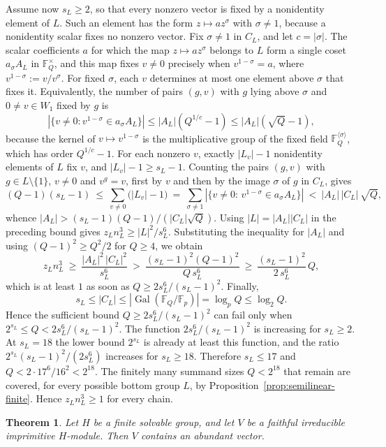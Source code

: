 \documentclass[10pt]{amsart}
\newtheorem{theorem}{Theorem}[section]
\theoremstyle{definition}
\renewcommand{\le}{\leqslant}
\renewcommand{\ge}{\geqslant}
\renewcommand{\geq}{\geqslant}
\let\oldendproof\endproof
\renewenvironment{proof}[1][\proofname]{%
  \oldproof[\bfseries #1]%
}{\oldendproof}
\DeclareMathOperator{\Gal}{Gal}
\numberwithin{equation}{section}
\numberwithin{table}{section}
\begin{document}
\begin{proof}
Assume now $s_L\ge2$, so that every nonzero vector is fixed by a nonidentity element
of $L$. Such an element has the form $z\mapsto az^\sigma$ with $\sigma\ne1$,
because a nonidentity scalar fixes no nonzero vector. Fix $\sigma\ne1$ in
$C_L$, and let $c=|\sigma|$. The scalar coefficients $a$ for which the map
$z\mapsto az^\sigma$ belongs to $L$ form a single coset $a_\sigma A_L$ in
$\mathbb{F}_Q^{\times}$, and this map fixes $v\ne0$ precisely when
$v^{1-\sigma}=a$, where
$v^{1-\sigma}:=v/v^\sigma$. For fixed
$\sigma$, each $v$ determines at most one element above $\sigma$ that fixes
it. Equivalently, the number of pairs $(g,v)$ with $g$ lying above $\sigma$
and $0\ne v\in W_1$ fixed by $g$ is
$$
 |\{v\ne0:v^{1-\sigma}\in a_\sigma A_L\}|
 \le |A_L|(Q^{1/c}-1)\le |A_L|(\sqrt Q-1),
$$
because the kernel of $v\mapsto v^{1-\sigma}$ is the multiplicative group of
the fixed field $\mathbb{F}_Q^{\langle\sigma\rangle}$, which has order
$Q^{1/c}-1$. For each nonzero $v$, exactly $|L_v|-1$ nonidentity elements
of $L$ fix $v$, and $|L_v|-1\geq s_L-1$. Counting the pairs $(g,v)$ with
$g\in L\setminus\{1\}$, $v\ne0$ and $v^g=v$, first by $v$ and then by the
image $\sigma$ of $g$ in $C_L$, gives
$$
  (Q-1)(s_L-1)\ \le\ \sum_{v\ne0}\bigl(|L_v|-1\bigr)
  \ =\ \sum_{\sigma\ne1}|\{v\ne0:\,v^{1-\sigma}\in a_\sigma A_L\}|
  \ <\ |A_L|\,|C_L|\,\sqrt Q,
$$
whence $|A_L|>(s_L-1)(Q-1)/(|C_L|\sqrt Q)$. Using
$|L|=|A_L||C_L|$ in the preceding bound gives
$z_Ln_L^{3}\ge|L|^{2}/s_L^{6}$. Substituting the inequality for $|A_L|$ and using $(Q-1)^{2}\ge
Q^{2}/2$ for $Q\ge4$, we obtain
$$
  z_Ln_L^{3}\ \ge\ \frac{|A_L|^{2}\,|C_L|^{2}}{s_L^{6}}
  \ >\ \frac{(s_L-1)^{2}(Q-1)^{2}}{Q\,s_L^{6}}
  \ \ge\ \frac{(s_L-1)^{2}}{2\,s_L^{6}}\,Q,
$$
which is at least $1$ as soon as $Q\ge 2s_L^{6}/(s_L-1)^{2}$. Finally,
$$
  s_L\le|C_L|\le |\Gal(\mathbb{F}_Q/\mathbb{F}_p)|
  =\log_p Q\le\log_2 Q.
$$
Hence the sufficient bound
$Q\ge2s_L^{6}/(s_L-1)^{2}$ can fail only when $2^{s_L}\le
Q<2s_L^{6}/(s_L-1)^{2}$. The function
$2s_L^{6}/(s_L-1)^{2}$ is increasing for $s_L\ge2$. At $s_L=18$ the
lower bound $2^{s_L}$ is already at least this function, and the ratio
$2^{s_L}(s_L-1)^2/(2s_L^6)$ increases for $s_L\ge18$. Therefore
$s_L\le17$ and $Q<2\cdot17^{6}/16^{2}<2^{18}$. The finitely many summand
sizes $Q<2^{18}$ that remain are covered, for every possible bottom group $L$, by
Proposition~\ref{prop:semilinear-finite}. Hence $z_Ln_L^{3}\ge1$ for every
chain.
\end{proof}

\begin{theorem}\label{thm:imprimitive}
Let $H$ be a finite solvable group, and let $V$ be a faithful irreducible
imprimitive $H$-module. Then $V$ contains an abundant vector.
\end{theorem}
\end{document}
